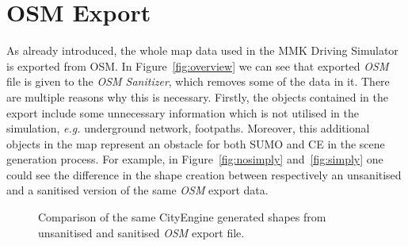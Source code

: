\section{OSM Export}
As already introduced, the whole map data used in the MMK Driving Simulator is exported from OSM. In Figure~\ref{fig:overview} we can see that exported \emph{OSM} file is given to the \emph{OSM Sanitizer}, which removes some of the data in it. There are multiple reasons why this is necessary. Firstly, the objects contained in the export include some unnecessary information which is not utilised in the simulation, \emph{e.g.} underground network, footpaths. Moreover, this additional objects in the map represent an obstacle for both SUMO and CE in the scene generation process. For example, in Figure~\ref{fig:nosimply} and~\ref{fig:simply} one could see the difference in the shape creation between respectively an unsanitised and a sanitised version of the same \emph{OSM} export data.  

\begin{figure}[htb]
	\centering
	\hspace{0.05\textwidth}%
	\caption{Comparison of the same CityEngine generated shapes from unsanitised and sanitised \emph{OSM} export file.}
\end{figure}

